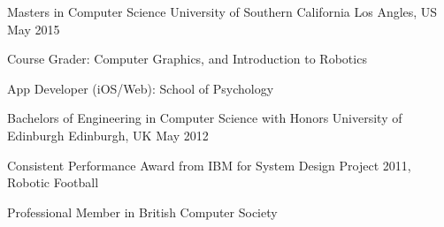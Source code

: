 \begin{cventries}
  \cventry
    {Masters in Computer Science}
    {University of Southern California}
    {Los Angles, US}
    {May 2015}
    {
      \begin{cvitems}
        \item {Course Grader: Computer Graphics, and Introduction to Robotics}
        \item {App Developer (iOS/Web): School of Psychology}
      \end{cvitems}
    }
  \cventry
    {Bachelors of Engineering in Computer Science with Honors}
    {University of Edinburgh}
    {Edinburgh, UK}
    {May 2012}
    {
      \begin{cvitems}
        \item {Consistent Performance Award from IBM for System Design Project 2011, Robotic Football}
        \item {Professional Member in British Computer Society}        
      \end{cvitems}
    }

\end{cventries}
